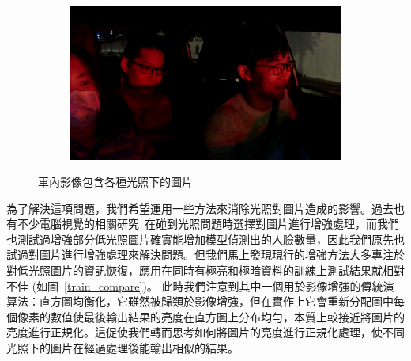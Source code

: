 \begin{figure}[t]
\begin{subfigure}[b]{0.22\textwidth}
\end{subfigure}
\begin{subfigure}[b]{0.22\textwidth}
    \includegraphics[width=\textwidth]{figures/car_7}
\end{subfigure}
\caption[車內影像範例]{車內影像包含各種光照下的圖片}
\label{fig:incar_face}
\end{figure}

為了解決這項問題，我們希望運用一些方法來消除光照對圖片造成的影響。過去也有不少電腦視覺的相關研究~\cite{cho2018face, kalaiselvi2013face, chen2018learning}在碰到光照問題時選擇對圖片進行增強處理，而我們也測試過增強部分低光照圖片確實能增加模型偵測出的人臉數量，因此我們原先也試過對圖片進行增強處理來解決問題。但我們馬上發現現行的增強方法大多專注於對低光照圖片的資訊恢復，應用在同時有極亮和極暗資料的訓練上測試結果就相對不佳 (如圖~\ref{train_compare})。
此時我們注意到其中一個用於影像增強的傳統演算法：直方圖均衡化，它雖然被歸類於影像增強，但在實作上它會重新分配圖中每個像素的數值使最後輸出結果的亮度在直方圖上分布均勻，本質上較接近將圖片的亮度進行正規化。這促使我們轉而思考如何將圖片的亮度進行正規化處理，使不同光照下的圖片在經過處理後能輸出相似的結果。

